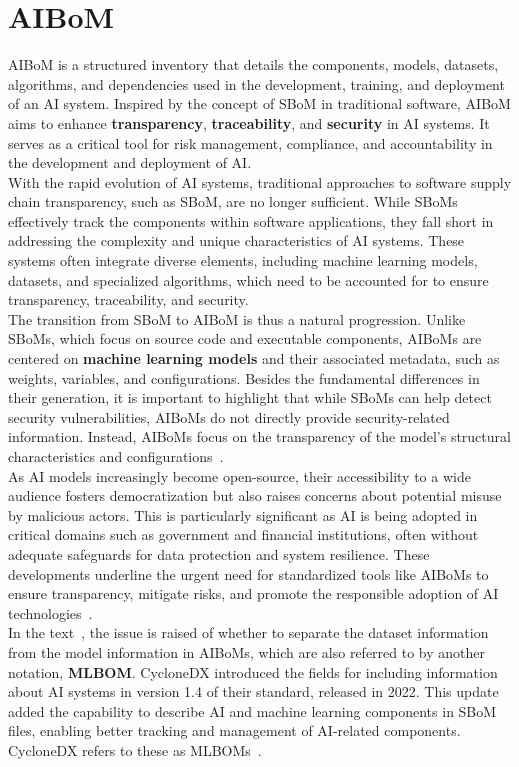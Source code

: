 \documentclass[12pt,a4paper, oneside, openright]{book}
\newcommand{\aibom}{{AIBoM}\xspace}
\newcommand{\aiboms}{{AIBoMs}\xspace}
\newcommand{\sbom}{{SBoM}\xspace}
\newcommand{\sboms}{{SBoMs}\xspace}
\begin{document}
\section{\aibom}
\aibom is a structured inventory that details the components, models, datasets, algorithms, and dependencies used in the development, training, and deployment of an AI system. Inspired by the concept of \sbom in traditional software, \aibom aims to enhance \textbf{transparency}, \textbf{traceability}, and \textbf{security} in AI systems. It serves as a critical tool for risk management, compliance, and accountability in the development and deployment of AI.\\
With the rapid evolution of AI systems, traditional approaches to software supply chain transparency, such as \sbom, are no longer sufficient. While \sboms effectively track the components within software applications, they fall short in addressing the complexity and unique characteristics of AI systems. These systems often integrate diverse elements, including machine learning models, datasets, and specialized algorithms, which need to be accounted for to ensure transparency, traceability, and security.\\
The transition from \sbom to \aibom is thus a natural progression.
Unlike \sboms, which focus on source code and executable components, \aiboms are centered on \textbf{machine learning models} and their associated metadata, such as weights, variables, and configurations.
Besides the fundamental differences in their generation, it is important to highlight that while \sboms can help detect security vulnerabilities, \aiboms do not directly provide security-related information. Instead, \aiboms focus on the transparency of the model’s structural characteristics and configurations~\cite{Driving_AI}.\\
As AI models increasingly become open-source, their accessibility to a wide audience fosters democratization but also raises concerns about potential misuse by malicious actors. 
This is particularly significant as AI is being adopted in critical domains such as government and financial institutions, often without adequate safeguards for data protection and system resilience. These developments underline the urgent need for standardized tools like \aiboms to ensure transparency, mitigate risks, and promote the responsible adoption of AI technologies~\cite{Driving_AI}.\\ 
 In the text~\cite{BOMs_Away!}, the issue is raised of whether to separate the dataset information from the model information in \aiboms, which are also referred to by another notation, \textbf{MLBOM}.
CycloneDX introduced the fields for including information about AI systems in version 1.4 of their standard, released in 2022.  This update added the capability to describe AI and machine learning components in \sbom files, enabling better tracking and management of AI-related components. CycloneDX refers to these as MLBOMs~\cite{CycloneDXMLBOM}.
\end{document}
